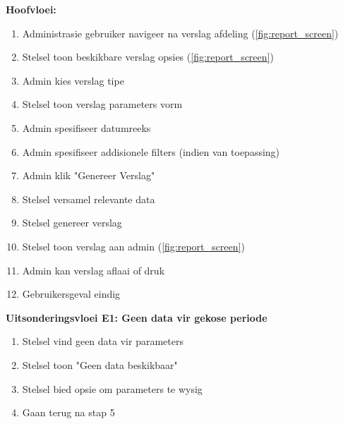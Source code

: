 \textbf{Hoofvloei:}
\begin{enumerate}
    \item Administrasie gebruiker navigeer na verslag afdeling (\autoref{fig:report_screen})
    \item Stelsel toon beskikbare verslag opsies (\autoref{fig:report_screen})
    \item Admin kies verslag tipe 
    \item Stelsel toon verslag parameters vorm
    \item Admin spesifiseer datumreeks
    \item Admin spesifiseer addisionele filters (indien van toepassing)
    \item Admin klik "Genereer Verslag"
    \item Stelsel versamel relevante data
    \item Stelsel genereer verslag
    \item Stelsel toon verslag aan admin (\autoref{fig:report_screen})
    \item Admin kan verslag aflaai of druk
    \item Gebruikersgeval eindig
\end{enumerate}

\textbf{Uitsonderingsvloei E1: Geen data vir gekose periode}
\begin{enumerate}
    \item[8a.] Stelsel vind geen data vir parameters
    \item Stelsel toon "Geen data beskikbaar"
    \item Stelsel bied opsie om parameters te wysig
    \item Gaan terug na stap 5
\end{enumerate}


